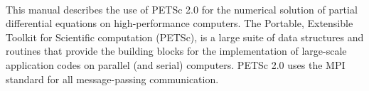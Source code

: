 %
%
%
\setlength{\textwidth}{6.5in}
\setlength{\oddsidemargin}{0.0in}
\setlength{\evensidemargin}{0.0in}
\setlength{\textheight}{9.2in}
\setlength{\topmargin}{-.8in}

\newcommand{\findex}[1]{\index{FUNCTION #1}}
\newcommand{\sindex}[1]{\index{#1}}
\newcommand{\F}{\mbox{\boldmath \(F\)}}
\newcommand{\x}{\mbox{\boldmath \(x\)}}
\newcommand{\rr}{\mbox{\boldmath \(r\)}}

\makeindex
 
\def\design{\medskip \noindent Design Issue:\begin{em}}
\def\enddesign{\end{em} \medskip}





\date{\today}

\newpage

\hbox{ }

\vspace{2in}


\medskip \medskip
This manual describes the use of PETSc 2.0 for the numerical solution
of partial differential equations on high-performance computers.  The
Portable, Extensible Toolkit for Scientific computation (PETSc), is a
large suite of data structures and routines that provide the building
blocks for the implementation of large-scale application codes on parallel
(and serial) computers.  PETSc 2.0 uses the MPI standard for all
message-passing communication.

